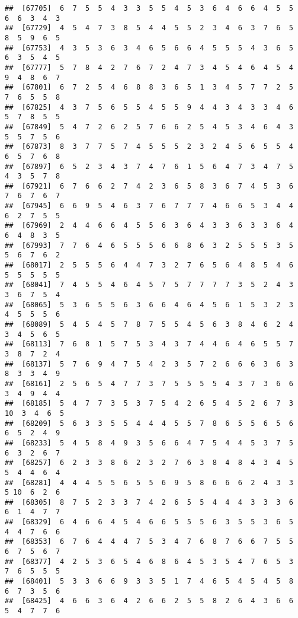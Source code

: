\documentclass[
]{book}
\begin{document}
\begin{verbatim}
##  [67705]  6  7  5  5  4  3  3  5  5  4  5  3  6  4  6  6  4  5  5  6  6  3  4  3
##  [67729]  4  5  4  7  3  8  5  4  4  5  5  2  3  4  6  3  7  6  5  8  5  9  6  5
##  [67753]  4  3  5  3  6  3  4  6  5  6  6  4  5  5  5  4  3  6  5  6  3  5  4  5
##  [67777]  5  7  8  4  2  7  6  7  2  4  7  3  4  5  4  6  4  5  4  9  4  8  6  7
##  [67801]  6  7  2  5  4  6  8  8  3  6  5  1  3  4  5  7  7  2  5  7  6  5  5  8
##  [67825]  4  3  7  5  6  5  5  4  5  5  9  4  4  3  4  3  3  4  6  5  7  8  5  5
##  [67849]  5  4  7  2  6  2  5  7  6  6  2  5  4  5  3  4  6  4  3  5  5  7  5  6
##  [67873]  8  3  7  7  5  7  4  5  5  5  2  3  2  4  5  6  5  5  4  6  5  7  6  8
##  [67897]  6  5  2  3  4  3  7  4  7  6  1  5  6  4  7  3  4  7  5  4  3  5  7  8
##  [67921]  6  7  6  6  2  7  4  2  3  6  5  8  3  6  7  4  5  3  6  7  6  7  6  7
##  [67945]  6  6  9  5  4  6  3  7  6  7  7  7  4  6  6  5  3  4  4  6  2  7  5  5
##  [67969]  2  4  4  6  6  4  5  5  6  3  6  4  3  3  6  3  3  6  4  6  4  8  3  5
##  [67993]  7  7  6  4  6  5  5  5  6  6  8  6  3  2  5  5  5  3  5  5  6  7  6  2
##  [68017]  2  5  5  5  6  4  4  7  3  2  7  6  5  6  4  8  5  4  6  5  5  5  5  5
##  [68041]  7  4  5  5  4  6  4  5  7  5  7  7  7  7  3  5  2  4  3  3  6  7  5  4
##  [68065]  5  3  6  5  5  6  3  6  6  4  6  4  5  6  1  5  3  2  3  4  5  5  5  6
##  [68089]  5  4  5  4  5  7  8  7  5  5  4  5  6  3  8  4  6  2  4  3  4  5  6  5
##  [68113]  7  6  8  1  5  7  5  3  4  3  7  4  4  6  4  6  5  5  7  3  8  7  2  4
##  [68137]  5  7  6  9  4  7  5  4  2  3  5  7  2  6  6  6  3  6  3  8  3  3  4  9
##  [68161]  2  5  6  5  4  7  7  3  7  5  5  5  5  4  3  7  3  6  6  3  4  9  4  4
##  [68185]  5  4  7  7  3  5  3  7  5  4  2  6  5  4  5  2  6  7  3 10  3  4  6  5
##  [68209]  5  6  3  3  5  5  4  4  4  5  5  7  8  6  5  5  6  5  6  6  5  2  4  9
##  [68233]  5  4  5  8  4  9  3  5  6  6  4  7  5  4  4  5  3  7  5  6  3  2  6  7
##  [68257]  6  2  3  3  8  6  2  3  2  7  6  3  8  4  8  4  3  4  5  5  4  4  6  4
##  [68281]  4  4  4  5  5  6  5  5  6  9  5  8  6  6  6  2  4  3  3  5 10  6  2  6
##  [68305]  8  7  5  2  3  3  7  4  2  6  5  5  4  4  4  3  3  3  6  6  1  4  7  7
##  [68329]  6  4  6  6  4  5  4  6  6  5  5  5  6  3  5  5  3  6  5  4  4  7  6  6
##  [68353]  6  7  6  4  4  4  7  5  3  4  7  6  8  7  6  6  7  5  5  6  7  5  6  7
##  [68377]  4  2  5  3  6  5  4  6  8  6  4  5  3  5  4  7  6  5  3  7  6  5  5  5
##  [68401]  5  3  3  6  6  9  3  3  5  1  7  4  6  5  4  5  4  5  8  6  7  3  5  6
##  [68425]  4  6  6  3  6  4  2  6  6  2  5  5  8  2  6  4  3  6  6  5  4  7  7  6

\end{verbatim}
\end{document}
